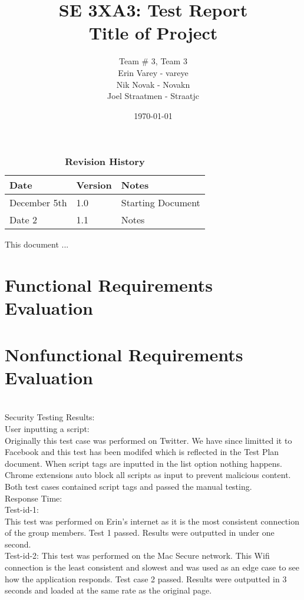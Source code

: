 \documentclass[12pt, titlepage]{article}
\title{SE 3XA3: Test Report\\Title of Project}
\author{Team \# 3, Team 3
		\\ Erin Varey - vareye
		\\ Nik Novak - Novakn
		\\ Joel Straatmen - Straatjc
}
\date{\today}
\begin{document}
\maketitle
{}
\tableofcontents
\listoftables
\listoffigures
\begin{table}[bp]
\caption{\bf Revision History}
\begin{tabularx}{\textwidth}{p{3cm}p{2cm}X}
\toprule {\bf Date} & {\bf Version} & {\bf Notes}\\
\midrule
December 5th & 1.0 & Starting Document\\
Date 2 & 1.1 & Notes\\
\bottomrule
\end{tabularx}
\end{table}
\newpage
{}
This document ...
\section{Functional Requirements Evaluation}

\section{Nonfunctional Requirements Evaluation}
\\
Security Testing Results:
\\
User inputting a script:
\\
Originally this test case was performed on Twitter. We have since limitted it to Facebook and this test has been modifed which is reflected in the Test Plan document. When script tags are inputted in the list option nothing happens. Chrome extensions auto block all scripts as input to prevent malicious content. Both test cases contained script tags and passed the manual testing.
\\
Response Time:
\\
Test-id-1: \\
This test was performed on Erin's internet as it is the most consistent connection of the group members. Test 1 passed. Results were outputted in under one second. \\
Test-id-2: This test was performed on the Mac Secure network. This Wifi connection is the least consistent and slowest and was used as an edge case to see how the application responds. Test case 2 passed. Results were outputted in 3 seconds and loaded at the same rate as the original page.
\end{document}
